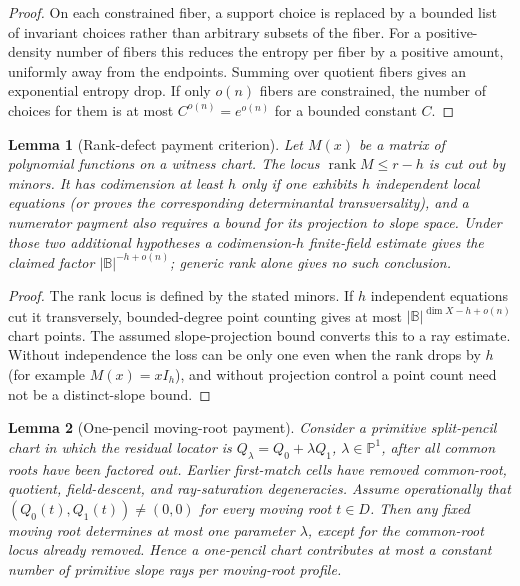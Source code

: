 \documentclass[12pt,a4paper]{amsart}
\numberwithin{equation}{section}
\newtheorem{lemma}[lemma]{Lemma}
\theoremstyle{remark}
\DeclareMathOperator{\rank}{rank}
\newcommand{\B}{\mathbb B}
\newcommand{\Pj}{\mathbb P}
\newcommand{\abs}[1]{\lvert #1\rvert}
\begin{document}
\begin{proof}
On each constrained fiber, a support choice is replaced by a bounded list of invariant choices rather than arbitrary subsets of the fiber.  For a positive-density number of fibers this reduces the entropy per fiber by a positive amount, uniformly away from the endpoints.  Summing over quotient fibers gives an exponential entropy drop.  If only \(o(n)\) fibers are constrained, the number of choices for them is at most \(C^{o(n)}=e^{o(n)}\) for a bounded constant \(C\).
\end{proof}

\begin{lemma}[Rank-defect payment criterion]\label{lem:rank-defect-payment}
Let \(M(x)\) be a matrix of polynomial functions on a witness chart.  The
locus \(\rank M\le r-h\) is cut out by minors.  It has codimension at least
\(h\) only if one exhibits \(h\) independent local equations (or proves
the corresponding determinantal transversality), and a numerator payment
also requires a bound for its projection to slope space.  Under those two
additional hypotheses a codimension-\(h\) finite-field estimate gives the
claimed factor \(\abs\B^{-h+o(n)}\); generic rank alone gives no such
conclusion.
\end{lemma}

\begin{proof}
The rank locus is defined by the stated minors.  If \(h\) independent
equations cut it transversely, bounded-degree point counting gives at most
\(\abs\B^{\dim X-h+o(n)}\) chart points.  The assumed slope-projection
bound converts this to a ray estimate.  Without independence the loss can
be only one even when the rank drops by \(h\) (for example
\(M(x)=xI_h\)), and without projection control a point count need not be a
distinct-slope bound.
\end{proof}

\begin{lemma}[One-pencil moving-root payment]\label{lem:pencil-payment}
Consider a primitive split-pencil chart in which the residual locator is
\(Q_\lambda=Q_0+\lambda Q_1\), \(\lambda\in\Pj^1\), after all common
roots have been factored out.  Earlier first-match cells have removed
common-root, quotient, field-descent, and ray-saturation degeneracies.
Assume operationally that
\((Q_0(t),Q_1(t))\ne(0,0)\) for every moving root \(t\in D\).  Then any
fixed moving root determines at most one parameter \(\lambda\), except for
the common-root locus already removed.  Hence a one-pencil chart contributes
at most a constant number of primitive slope rays per moving-root profile.
\end{lemma}
\end{document}
